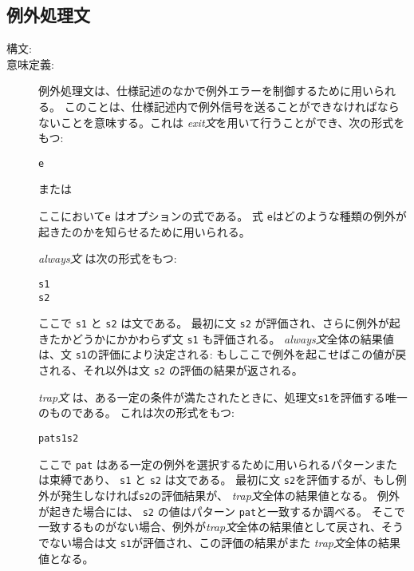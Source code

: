 \documentclass[\pformat,12pt]{jarticle}
\begin{document}
\subsection{例外処理文}

\begin{description}
\item[構文:]






\item[意味定義:] 例外処理文は、仕様記述のなかで例外エラーを制御するために用いられる。
このことは、仕様記述内で例外信号を送ることができなければならないことを意味する。これは {\it exit文}を用いて行うことができ、次の形式をもつ:
  \begin{alltt}
     e
  \end{alltt}
または
  \begin{alltt}
  \end{alltt}
 ここにおいて{\tt e} はオプションの式である。
式 {\tt e}はどのような種類の例外が起きたのかを知らせるために用いられる。

  {\it always文\/} は次の形式をもつ:
  \begin{alltt}
     s1 
    s2
  \end{alltt}
ここで {\tt s1} と {\tt s2} は文である。
最初に文 {\tt s2} が評価され、さらに例外が起きたかどうかにかかわらず文 {\tt s1} も評価される。
 {\it always文\/}全体の結果値は、文 {\tt s1}の評価により決定される: もしここで例外を起こせばこの値が戻される、それ以外は文 {\tt s2} の評価の結果が返される。

 {\it trap文\/} は、ある一定の条件が満たされたときに、処理文{\tt s1}を評価する唯一のものである。
これは次の形式をもつ:
\begin{alltt} 
     pat  s1  s2 
\end{alltt}
ここで {\tt pat} はある一定の例外を選択するために用いられるパターンまたは束縛であり、 {\tt s1} と {\tt s2} は文である。
最初に文 {\tt s2}を評価するが、もし例外が発生しなければ{\tt s2}の評価結果が、 {\it trap文\/}全体の結果値となる。
例外が起きた場合には、 {\tt s2} の値はパターン {\tt pat}と一致するか調べる。
そこで一致するものがない場合、例外が{\it trap文}全体の結果値として戻され、そうでない場合は文 {\tt s1}が評価され、この評価の結果がまた {\it trap文}全体の結果値となる。


\end{description}
\end{document}
